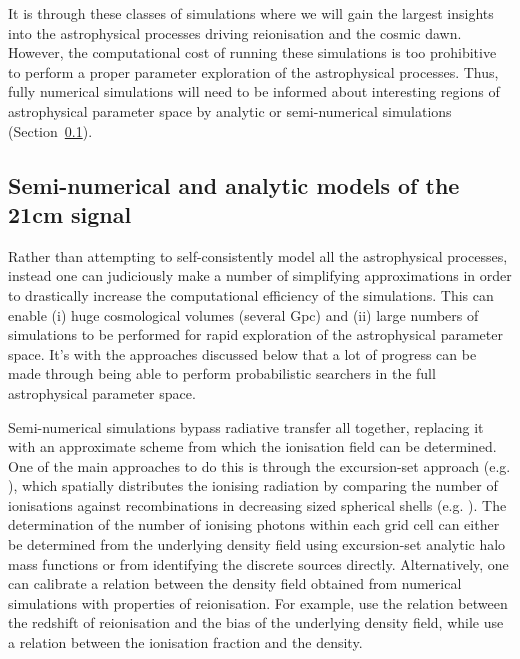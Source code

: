 It is through these classes of simulations where we will gain the largest insights into the astrophysical processes driving reionisation and the cosmic dawn. However, the computational cost of running these simulations is too prohibitive to perform a proper parameter exploration of the astrophysical processes. Thus, fully numerical simulations will need to be informed about interesting regions of astrophysical parameter space by analytic or semi-numerical simulations (Section~\ref{sec:efficientsims}).

\subsection{Semi-numerical and analytic models of the 21cm signal} \label{sec:efficientsims}

Rather than attempting to self-consistently model all the astrophysical processes, instead one can judiciously make a number of simplifying approximations in order to drastically increase the computational efficiency of the simulations. This can enable (i) huge cosmological volumes (several Gpc) and (ii) large numbers of simulations to be performed for rapid exploration of the astrophysical parameter space. It's with the approaches discussed below that a lot of progress can be made through being able to perform probabilistic searchers in the full astrophysical parameter space.

Semi-numerical simulations bypass radiative transfer all together, replacing it with an approximate scheme from which the ionisation field can be determined. One of the main approaches to do this is through the excursion-set approach (e.g. \cite{Furlanetto:2004}), which spatially distributes the ionising radiation by comparing the number of ionisations against recombinations in decreasing sized spherical shells (e.g. \cite{Mesinger:2007,Zahn:2007,Geil:2008,Alvarez:2009,Santos:2010,Mesinger:2011,Visbal:2012,Kim:2013,Fialkov:2014a,Majumdar:2014,Choudhury:2015,Hassan:2016,Kulkarni:2016,Mutch:2016,Hutter:2018b,Park:2019}). The determination of the number of ionising photons within each grid cell can either be determined from the underlying density field using excursion-set analytic halo mass functions or from identifying the discrete sources directly. Alternatively, one can calibrate a relation between the density field obtained from numerical simulations with properties of reionisation. For example, \cite{Battaglia:2013} use the relation between the redshift of reionisation and the bias of the underlying density field, while \cite{Kim:2016} use a relation between the ionisation fraction and the density.

